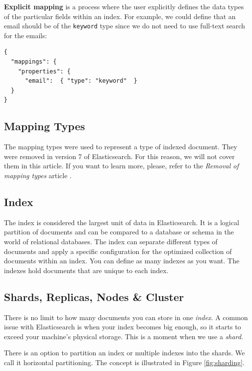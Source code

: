 \documentclass[12pt,a4,twoside]{article}
\newenvironment{code}{\captionsetup{type=listing, justification=centering}}{}
\begin{document}
\textbf{Explicit mapping} is a process where the user explicitly defines the data types of the particular fields within an index. For example, we could define that an email should be of the \texttt{keyword} type since we do not need to use full-text search for the emails:

\begin{code}
\begin{verbatim}
{
  "mappings": {
    "properties": { 
      "email":  { "type": "keyword"  }
  }
}
\end{verbatim}
\label{code:explicit_mapping}
\end{code}

\subsection{Mapping Types}

The mapping types were used to represent a type of indexed document. They were removed in version 7 of Elasticsearch. For this reason, we will not cover them in this article. If you want to learn more, please, refer to the \textit{Removal of mapping types} article \cite{mapping_types}.

\subsection{Index}

The index is considered the largest unit of data in Elasticsearch. It is a logical partition of documents and can be compared to a database or schema in the world of relational databases. The index can separate different types of documents and apply a specific configuration for the optimized collection of documents within an index. You can define as many indexes as you want. The indexes hold documents that are unique to each index.

\subsection{Shards, Replicas, Nodes \& Cluster}

There is no limit to how many documents you can store in one \textit{index}. A common issue with Elasticsearch is when your index becomes big enough, so it starts to exceed your machine's physical storage. This is a moment when we use a \textit{shard}.

There is an option to partition an index or multiple indexes into the shards. We call it horizontal partitioning. The concept is illustrated in Figure \ref{fig:sharding}.
\end{document}
